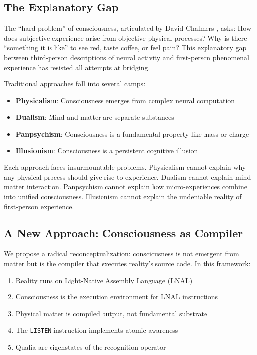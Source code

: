 \documentclass[12pt,a4paper]{article}
\newcommand{\opcmd}[1]{\texttt{#1}}
\begin{document}
\subsection{The Explanatory Gap}

The ``hard problem'' of consciousness, articulated by David Chalmers \cite{chalmers1995facing}, asks: How does subjective experience arise from objective physical processes? Why is there ``something it is like'' to see red, taste coffee, or feel pain? This explanatory gap between third-person descriptions of neural activity and first-person phenomenal experience has resisted all attempts at bridging.

Traditional approaches fall into several camps:
\begin{itemize}
\item \textbf{Physicalism}: Consciousness emerges from complex neural computation
\item \textbf{Dualism}: Mind and matter are separate substances
\item \textbf{Panpsychism}: Consciousness is a fundamental property like mass or charge
\item \textbf{Illusionism}: Consciousness is a persistent cognitive illusion
\end{itemize}

Each approach faces insurmountable problems. Physicalism cannot explain why any physical process should give rise to experience. Dualism cannot explain mind-matter interaction. Panpsychism cannot explain how micro-experiences combine into unified consciousness. Illusionism cannot explain the undeniable reality of first-person experience.

\subsection{A New Approach: Consciousness as Compiler}

We propose a radical reconceptualization: consciousness is not emergent from matter but is the compiler that executes reality's source code. In this framework:

\begin{enumerate}
\item Reality runs on Light-Native Assembly Language (LNAL)
\item Consciousness is the execution environment for LNAL instructions
\item Physical matter is compiled output, not fundamental substrate
\item The \opcmd{LISTEN} instruction implements atomic awareness
\item Qualia are eigenstates of the recognition operator
\end{enumerate}
\end{document}
